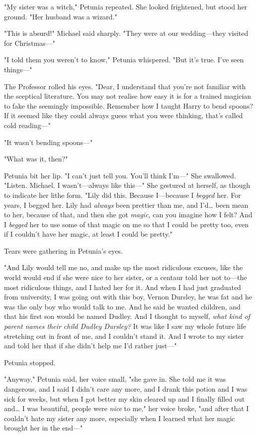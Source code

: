 "My sister was a witch," Petunia repeated. She looked frightened, but stood her 
ground. "Her husband was a wizard."

"This is absurd!" Michael said sharply. "They were at our wedding---they 
visited for Christmas---"

"I told them you weren't to know," Petunia whispered. "But it's true. I've seen 
things---"

The Professor rolled his eyes. "Dear, I understand that you're not familiar 
with the sceptical literature. You may not realise how easy it is for a trained 
magician to fake the seemingly impossible. Remember how I taught Harry to bend 
spoons? If it seemed like they could always guess what you were thinking, 
that's called cold reading---"

"It wasn't bending spoons---"

"What was it, then?"

Petunia bit her lip. "I can't just tell you. You'll think I'm---" She 
swallowed. "Listen. Michael. I wasn't---always like this---" She gestured at 
herself, as though to indicate her lithe form. "Lily did this. Because 
I---because I \emph{begged} her. For years, I begged her. Lily had 
\emph{always} been prettier than me, and I'd{\ldots} been mean to her, because 
of that, and then she got \emph{magic,} can you imagine how I felt? And I 
\emph{begged} her to use some of that magic on me so that I could be pretty 
too, even if I couldn't have her magic, at least I could be pretty."

Tears were gathering in Petunia's eyes.

"And Lily would tell me no, and make up the most ridiculous excuses, like the 
world would end if she were nice to her sister, or a centaur told her not 
to---the most ridiculous things, and I hated her for it. And when I had just 
graduated from university, I was going out with this boy, Vernon Dursley, he 
was fat and he was the only boy who would talk to me. And he said he wanted 
children, and that his first son would be named Dudley. And I thought to 
myself, \emph{what kind of parent names their child Dudley Dursley?} It was 
like I saw my whole future life stretching out in front of me, and I couldn't 
stand it. And I wrote to my sister and told her that if she didn't help me I'd 
rather just---"

Petunia stopped.

"Anyway," Petunia said, her voice small, "she gave in. She told me it was 
dangerous, and I said I didn't care any more, and I drank this potion and I was 
sick for weeks, but when I got better my skin cleared up and I finally filled 
out and{\ldots} I was beautiful, people were \emph{nice} to me," her voice 
broke, "and after that I couldn't hate my sister any more, especially when I 
learned what her magic brought her in the end---"

